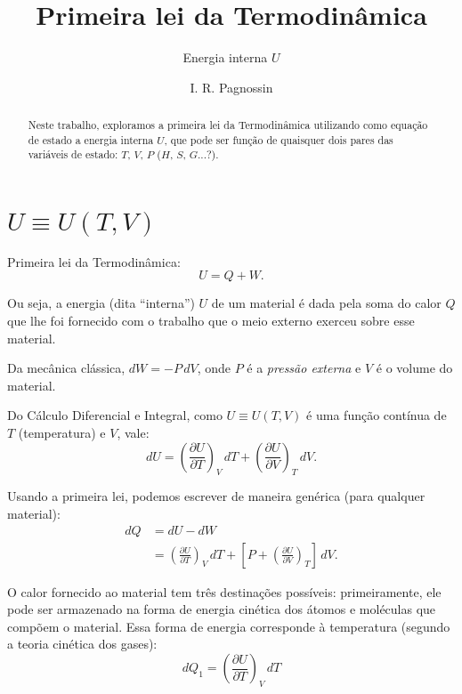 \documentclass[a4paper,12pt]{scrartcl}
\title{Primeira lei da Termodinâmica}
\subtitle{Energia interna $U$}
\author{I. R. Pagnossin}
\begin{document}
\maketitle

\begin{abstract}
  Neste trabalho, exploramos a primeira lei da Termodinâmica utilizando como equação de estado a energia interna $U$, que pode ser função de quaisquer dois pares das variáveis de estado: $T$, $V$, $P$ ($H$, $S$, $G$...?).
\end{abstract}

\newcommand\D[3]{\ensuremath{\left(\frac{\partial #1}{\partial #2}\right)_{#3}}}

\section{$U \equiv U(T,V)$}

  Primeira lei da Termodinâmica:
  \begin{equation}\label{eq:1st-law}
  U = Q + W. 
  \end{equation}

  Ou seja, a energia (dita ``interna'') $U$ de um material é dada pela soma do calor $Q$ que lhe foi fornecido com o trabalho que o meio externo exerceu sobre esse material.
  
  Da mecânica clássica, $dW = -P\, dV$, onde $P$ é a \emph{pressão externa} e $V$ é o volume do material.
  
  Do Cálculo Diferencial e Integral, como $U \equiv U(T,V)$ é uma função contínua de $T$ (temperatura) e $V$, vale:
  \begin{equation*}
  dU = \D{U}{T}{V}\, dT + \D{U}{V}{T}\, dV.
  \end{equation*}
  
  Usando a primeira lei, podemos escrever de maneira genérica (para qualquer material):
  \begin{align}
  dQ &= dU - dW \nonumber\\
     &= \D{U}{T}{V}\, dT+ \left[P + \D{U}{V}{T}\right]\, dV.\label{eq:dQ}
  \end{align}

  O calor fornecido ao material tem três destinações possíveis: primeiramente, ele pode ser armazenado na forma de energia cinética dos átomos e moléculas que compõem o material. Essa forma de energia corresponde à temperatura (segundo a teoria cinética dos gases):
  \begin{equation*}
  dQ_1 = \D{U}{T}{V}\, dT
  \end{equation*}
\end{document}
